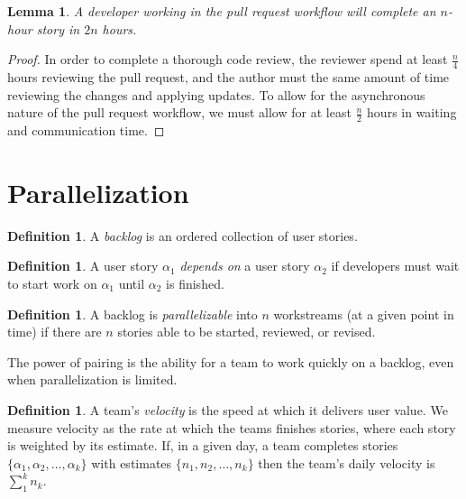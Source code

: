 \documentclass[letterpaper]{article}
\newtheorem{lemma}[theorem]{Lemma}
\theoremstyle{definition}
\newtheorem{definition}[theorem]{Definition}
\begin{document}
    \begin{lemma}\label{lemma:solo}
        A developer working in the pull request workflow will complete an $n$-hour story in $2n$ hours.
    \end{lemma}
    \begin{proof}
        In order to complete a thorough code review, the reviewer spend at least $\frac{n}{4}$ hours reviewing the pull
        request, and the author must the same amount of time reviewing the changes and applying updates.
        To allow for the asynchronous nature of the pull request workflow, we must allow for at least $\frac{n}{2}$
        hours in waiting and communication time.
    \end{proof}

    \section{Parallelization}\label{sec:parallelization}

    \begin{definition}
        A \textit{backlog} is an ordered collection of user stories.
    \end{definition}

    \begin{definition}
        A user story $\alpha_1$ \textit{depends on} a user story $\alpha_2$ if developers must wait to start work on
        $\alpha_1$ until $\alpha_2$ is finished.
    \end{definition}

    \begin{definition}
        A backlog is \textit{parallelizable} into $n$ workstreams (at a given point in time) if there are $n$ stories
        able to be started, reviewed, or revised.
    \end{definition}

    The power of pairing is the ability for a team to work quickly on a backlog, even when parallelization is limited.

    \begin{definition}
        A team's \textit{velocity} is the speed at which it delivers user value.
        We measure velocity as the rate at which the teams finishes stories, where each story is weighted by its
        estimate.
        If, in a given day, a team completes stories $\{\alpha_1, \alpha_2,\dots,\alpha_k\}$ with estimates
        $\{n_1, n_2,\dots,n_k\}$ then the team's daily velocity is $\sum_1^k n_k$.
    \end{definition}
\end{document}
